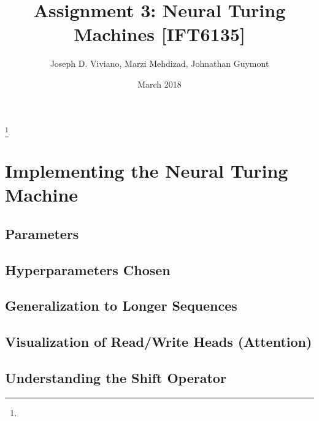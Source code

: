 \documentclass{amsart}
\theoremstyle{definition}
\theoremstyle{remark}
\numberwithin{equation}{section}
\begin{document}
\title{Assignment 3: Neural Turing Machines [IFT6135]}

\author{Joseph D. Viviano, Marzi Mehdizad, Johnathan Guymont}
\address{Universit\'e de Montr\'eal}
\curraddr{}
\thanks{}
\date{March 2018}

\maketitle

\section{Implementing the Neural Turing Machine}

\subsection{Parameters}
\subsection{Hyperparameters Chosen}
\subsection{Generalization to Longer Sequences}
\subsection{Visualization of Read/Write Heads (Attention)}
\subsection{Understanding the Shift Operator}
\end{document}
